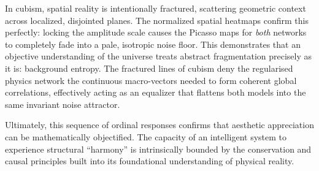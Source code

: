 \documentclass[11pt,twocolumn]{article}
\begin{document}
In cubism, spatial reality is intentionally fractured, scattering geometric context across localized, disjointed planes. The normalized spatial heatmaps confirm this perfectly: locking the amplitude scale causes the Picasso maps for \textit{both} networks to completely fade into a pale, isotropic noise floor. This demonstrates that an objective understanding of the universe treats abstract fragmentation precisely as it is: background entropy. The fractured lines of cubism deny the regularised physics network the continuous macro-vectors needed to form coherent global correlations, effectively acting as an equalizer that flattens both models into the same invariant noise attractor. 

Ultimately, this sequence of ordinal responses confirms that aesthetic appreciation can be mathematically objectified. The capacity of an intelligent system to experience structural ``harmony'' is intrinsically bounded by the conservation and causal principles built into its foundational understanding of physical reality.
\end{document}
